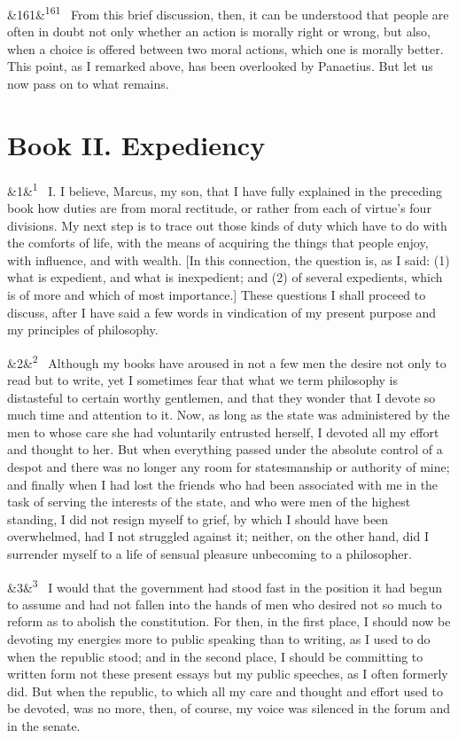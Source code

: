 \documentclass[12pt]{article}
\newcommand{\para}[1][]{\par\noindent\ifx&#1&\else\textsuperscript{\footnotesize #1}~\fi}
\begin{document}
\para[161] From this brief discussion, then, it can be understood that people are often in doubt not only whether an action is morally right or wrong, but also, when a choice is offered between two moral actions, which one is morally better. This point, as I remarked above, has been overlooked by Panaetius. But let us now pass on to what remains.

\section*{Book II. Expediency}

\para[1] I. I believe, Marcus, my son, that I have fully explained in the preceding book how duties are from moral rectitude, or rather from each of virtue's four divisions. My next step is to trace out those kinds of duty which have to do with the comforts of life, with the means of acquiring the things that people enjoy, with influence, and with wealth. [In this connection, the question is, as I said: (1) what is expedient, and what is inexpedient; and (2) of several expedients, which is of more and which of most importance.] These questions I shall proceed to discuss, after I have said a few words in vindication of my present purpose and my principles of philosophy.

\para[2] Although my books have aroused in not a few men the desire not only to read but to write, yet I sometimes fear that what we term philosophy is distasteful to certain worthy gentlemen, and that they wonder that I devote so much time and attention to it. Now, as long as the state was administered by the men to whose care she had voluntarily entrusted herself, I devoted all my effort and thought to her. But when everything passed under the absolute control of a despot and there was no longer any room for statesmanship or authority of mine; and finally when I had lost the friends who had been associated with me in the task of serving the interests of the state, and who were men of the highest standing, I did not resign myself to grief, by which I should have been overwhelmed, had I not struggled against it; neither, on the other hand, did I surrender myself to a life of sensual pleasure unbecoming to a philosopher.

\para[3] I would that the government had stood fast in the position it had begun to assume and had not fallen into the hands of men who desired not so much to reform as to abolish the constitution. For then, in the first place, I should now be devoting my energies more to public speaking than to writing, as I used to do when the republic stood; and in the second place, I should be committing to written form not these present essays but my public speeches, as I often formerly did. But when the republic, to which all my care and thought and effort used to be devoted, was no more, then, of course, my voice was silenced in the forum and in the senate.
\end{document}

